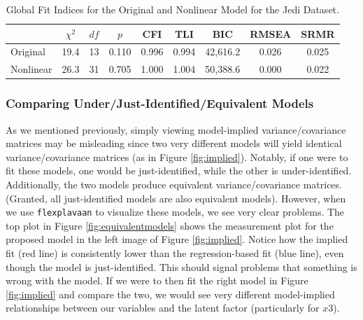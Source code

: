 \documentclass[
  english,
  man]{apa6}
\begin{document}
\begin{table}[tbp]

\begin{center}
\begin{threeparttable}

\caption{\label{tab:tabresults}Global Fit Indices for the Original and Nonlinear Model for the Jedi Dataset.}

\begin{tabular}{lcccccccc}
\toprule
 & $\chi^2$ & $df$ & $p$ & CFI & TLI & BIC & RMSEA & SRMR\\
\midrule
Original & 19.4 & 13 & 0.110 & 0.996 & 0.994 & 42,616.2 & 0.026 & 0.025\\
Nonlinear & 26.3 & 31 & 0.705 & 1.000 & 1.004 & 50,388.6 & 0.000 & 0.022\\
\bottomrule
\end{tabular}

\end{threeparttable}
\end{center}

\end{table}

\hypertarget{comparing-underjust-identifiedequivalent-models}{%
\subsubsection{Comparing Under/Just-Identified/Equivalent Models}\label{comparing-underjust-identifiedequivalent-models}}

As we mentioned previously, simply viewing model-implied variance/covariance matrices may be misleading since two very different models will yield identical variance/covariance matrices (as in Figure \ref{fig:implied}). Notably, if one were to fit these models, one would be just-identified, while the other is under-identified. Additionally, the two models produce equivalent variance/covariance matrices. (Granted, all just-identified models are also equivalent models). However, when we use \texttt{flexplavaan} to visualize these models, we see very clear problems. The top plot in Figure \ref{fig:equivalentmodels} shows the measurement plot for the proposed model in the left image of Figure \ref{fig:implied}. Notice how the implied fit (red line) is consistently lower than the regression-based fit (blue line), even though the model is just-identified. This should signal problems that something is wrong with the model. If we were to then fit the right model in Figure \ref{fig:implied} and compare the two, we would see very different model-implied relationships between our variables and the latent factor (particularly for \(x3\)).
\end{document}

